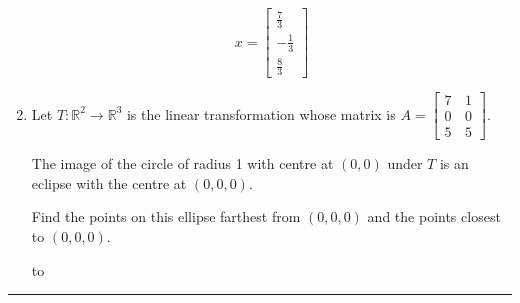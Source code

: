 \documentclass[11pt]{article}
\newcommand{\hdotrule}[1]{\hbox to \textwidth{\leaders\hbox to #1pt{\hss . \hss}\hfil}}
\begin{document}
\begin{preview}
\begin{enumerate}
            $$x=\begin{bmatrix}\frac{7}{3}\\-\frac{1}{3}\\\frac{8}{3}\end{bmatrix}$$
            
            \setcounter{enumi}{4}
            \item Let $T : \mathbb{R}^2 \rightarrow \mathbb{R}^3$ is the linear transformation whose matrix is $A = \begin{bmatrix}
                  7 &\, 1 \\ 0 &\, 0 \\ 5 &\, 5 
            \end{bmatrix}$. 
            
            The image of the circle of radius 1 with centre at $(0,0)$ under $T$ is an eclipse with the centre at $(0,0,0)$. 
            
            Find the points on this ellipse farthest from $(0,0,0)$ and the points closest to $(0,0,0)$.

            \hdotrule{5}

      \end{enumerate}
      \hrule
\end{preview}
\end{document}
